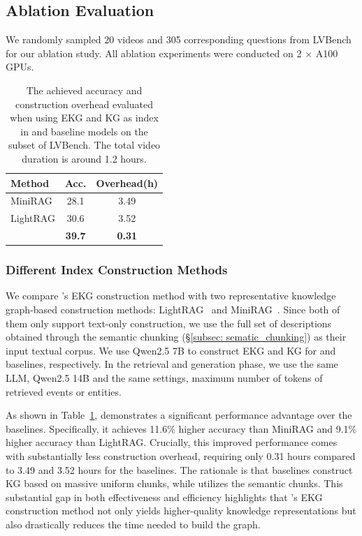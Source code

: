 \subsection{Ablation Evaluation}
\label{subsec:ablation}
We randomly sampled 20 videos and 305 corresponding questions from LVBench for our ablation study. All ablation experiments were conducted on 2 $\times$ A100 GPUs.

\begin{table}[!t]
\centering
\label{tab:context_length}
\begin{tabular}{lcc} 
\toprule[1.5pt]
\textbf{Method} & \textbf{Acc.} & \textbf{Overhead(h)}  \\ 
\midrule
MiniRAG         &     28.1          &          3.49                   \\
LightRAG        &   30.6            &   3.52                          \\
\sysname{}         &      \textbf{39.7}         &       \textbf{0.31}                    \\
\bottomrule[1.5pt]
\end{tabular}
\caption{The achieved accuracy and construction overhead evaluated when using EKG and KG as index in \sysname{} and baseline models on the subset of LVBench. The total video duration is around 1.2 hours.}
\label{tab:ekg_kg}
\end{table}

\subsubsection{Different Index Construction Methods}
We compare \sysname{}’s EKG construction method with two representative knowledge graph-based 
construction methods: LightRAG~\cite{guo2024lightrag} and MiniRAG~\cite{fan2025minirag}. Since both of them only support text-only construction, we use the full set of descriptions obtained through the semantic chunking (\S\ref{subsec: sematic_chunking}) as their input textual corpus. 
We use Qwen2.5 7B to construct EKG and KG for \sysname and baselines, respectively. In the retrieval and generation phase, we use the same LLM, Qwen2.5 14B and the same settings, \eg maximum number of tokens of retrieved events or entities.


As shown in Table~\ref{tab:ekg_kg}, \sysname{} demonstrates a significant performance advantage over the baselines. Specifically, it achieves 11.6\% higher accuracy than MiniRAG and 9.1\% higher accuracy than LightRAG. Crucially, this improved performance comes with substantially less construction overhead, requiring only 0.31 hours compared to 3.49 and 3.52 hours for the baselines. The rationale is that baselines construct KG based on massive uniform chunks, while \sysname utilizes the semantic chunks. This substantial gap in both effectiveness and efficiency highlights that \sysname{}'s EKG construction method not only yields higher-quality knowledge representations but also drastically reduces the time needed to build the graph.


